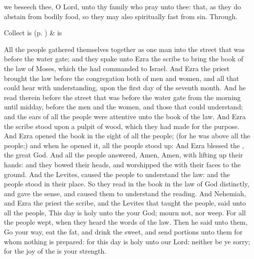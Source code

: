 \collect
{} we beseech thee, O Lord, unto thy family who pray unto thee: that, as they do abstain from bodily food, so they may also spiritually fast from sin. Through.
\begin{rubric}
     Collect is  (p. \pageref{SPSaints}) \&  is 
\end{rubric}

 All the people gathered themselves together as one man into the street that was before the water gate; and they spake unto Ezra the scribe to bring the book of the law of Moses, which the  had commanded to Israel. And Ezra the priest brought the law before the congregation both of men and women, and all that could hear with understanding, upon the first day of the seventh month. And he read therein before the street that was before the water gate from the morning until midday, before the men and the women, and those that could understand; and the ears of all the people were attentive unto the book of the law. And Ezra the scribe stood upon a pulpit of wood, which they had made for the purpose. And Ezra opened the book in the sight of all the people; (for he was above all the people;) and when he opened it, all the people stood up: And Ezra blessed the , the great God. And all the people answered, Amen, Amen, with lifting up their hands: and they bowed their heads, and worshipped the  with their faces to the ground. And the Levites, caused the people to understand the law: and the people stood in their place. So they read in the book in the law of God distinctly, and gave the sense, and caused them to understand the reading. And Nehemiah, and Ezra the priest the scribe, and the Levites that taught the people, said unto all the people, This day is holy unto the  your God; mourn not, nor weep. For all the people wept, when they heard the words of the law. Then he said unto them, Go your way, eat the fat, and drink the sweet, and send portions unto them for whom nothing is prepared: for this day is holy unto our Lord: neither be ye sorry; for the joy of the  is your strength.


